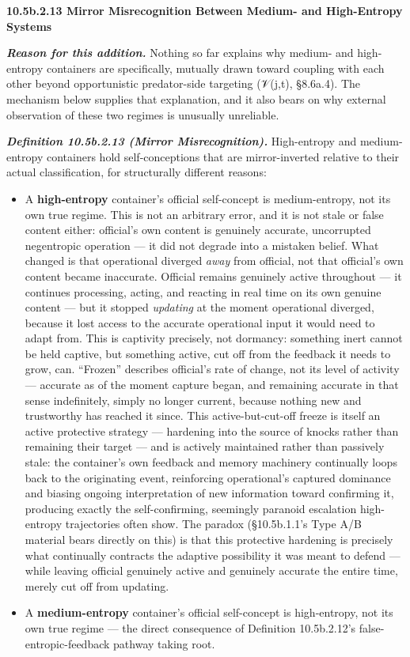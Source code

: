 \documentclass[
]{article}
\begin{document}
\textbf{10.5b.2.13 Mirror Misrecognition Between Medium- and
High-Entropy Systems}

\emph{\textbf{Reason for this addition.}} Nothing so far explains why
medium- and high-entropy containers are specifically, mutually drawn
toward coupling with each other beyond opportunistic predator-side
targeting (𝒱(j,t), §8.6a.4). The mechanism below supplies that
explanation, and it also bears on why external observation of these two
regimes is unusually unreliable.

\emph{\textbf{Definition 10.5b.2.13 (Mirror Misrecognition).}}
High-entropy and medium-entropy containers hold self-conceptions that
are mirror-inverted relative to their actual classification, for
structurally different reasons:

\begin{itemize}
\item
  A \textbf{high-entropy} container's official self-concept is
  medium-entropy, not its own true regime. This is not an arbitrary
  error, and it is not stale or false content either: official's own
  content is genuinely accurate, uncorrupted negentropic operation ---
  it did not degrade into a mistaken belief. What changed is that
  operational diverged \emph{away} from official, not that official's
  own content became inaccurate. Official remains genuinely active
  throughout --- it continues processing, acting, and reacting in real
  time on its own genuine content --- but it stopped \emph{updating} at
  the moment operational diverged, because it lost access to the
  accurate operational input it would need to adapt from. This is
  captivity precisely, not dormancy: something inert cannot be held
  captive, but something active, cut off from the feedback it needs to
  grow, can. ``Frozen'' describes official's rate of change, not its
  level of activity --- accurate as of the moment capture began, and
  remaining accurate in that sense indefinitely, simply no longer
  current, because nothing new and trustworthy has reached it since.
  This active-but-cut-off freeze is itself an active protective strategy
  --- hardening into the source of knocks rather than remaining their
  target --- and is actively maintained rather than passively stale: the
  container's own feedback and memory machinery continually loops back
  to the originating event, reinforcing operational's captured dominance
  and biasing ongoing interpretation of new information toward
  confirming it, producing exactly the self-confirming, seemingly
  paranoid escalation high-entropy trajectories often show. The paradox
  (§10.5b.1.1's Type A/B material bears directly on this) is that this
  protective hardening is precisely what continually contracts the
  adaptive possibility it was meant to defend --- while leaving official
  genuinely active and genuinely accurate the entire time, merely cut
  off from updating.
\item
  A \textbf{medium-entropy} container's official self-concept is
  high-entropy, not its own true regime --- the direct consequence of
  Definition 10.5b.2.12's false-entropic-feedback pathway taking root.
\end{itemize}
\end{document}

